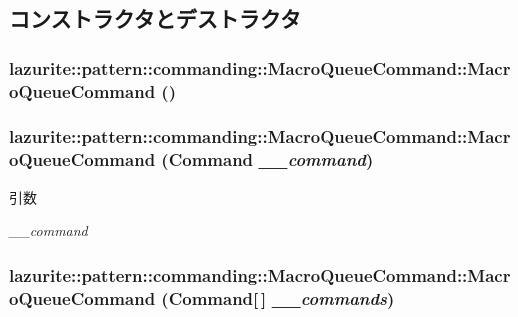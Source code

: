 \subsection{コンストラクタとデストラクタ}
\hypertarget{classlazurite_1_1pattern_1_1commanding_1_1_macro_queue_command_a883ecb58a4547e87deeb4bc19814f496}{
\subsubsection[{MacroQueueCommand}]{\setlength{\rightskip}{0pt plus 5cm}lazurite::pattern::commanding::MacroQueueCommand::MacroQueueCommand ()}}
\label{classlazurite_1_1pattern_1_1commanding_1_1_macro_queue_command_a883ecb58a4547e87deeb4bc19814f496}
\hypertarget{classlazurite_1_1pattern_1_1commanding_1_1_macro_queue_command_a2080c08372c15eeabd8c1e858620eee5}{
\subsubsection[{MacroQueueCommand}]{\setlength{\rightskip}{0pt plus 5cm}lazurite::pattern::commanding::MacroQueueCommand::MacroQueueCommand ({\bf Command} {\em \_\-\_\-command})}}
\label{classlazurite_1_1pattern_1_1commanding_1_1_macro_queue_command_a2080c08372c15eeabd8c1e858620eee5}

\begin{DoxyParams}{引数}
\item[{\em \_\-\_\-command}]\end{DoxyParams}
\hypertarget{classlazurite_1_1pattern_1_1commanding_1_1_macro_queue_command_a9a95a25f0c22f251568592e3f122b7cd}{
\subsubsection[{MacroQueueCommand}]{\setlength{\rightskip}{0pt plus 5cm}lazurite::pattern::commanding::MacroQueueCommand::MacroQueueCommand ({\bf Command}\mbox{[}$\,$\mbox{]} {\em \_\-\_\-commands})}}
\label{classlazurite_1_1pattern_1_1commanding_1_1_macro_queue_command_a9a95a25f0c22f251568592e3f122b7cd}

